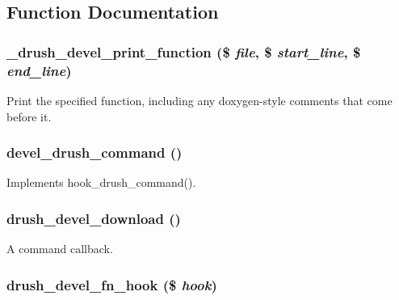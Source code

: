 \subsection{Function Documentation}
\hypertarget{devel_8drush_8inc_aace73474842484a9c0a90bf04752adc4}{
\subsubsection[{\_\-drush\_\-devel\_\-print\_\-function}]{\setlength{\rightskip}{0pt plus 5cm}\_\-drush\_\-devel\_\-print\_\-function (\$ {\em file}, \/  \$ {\em start\_\-line}, \/  \$ {\em end\_\-line})}}
\label{devel_8drush_8inc_aace73474842484a9c0a90bf04752adc4}
Print the specified function, including any doxygen-\/style comments that come before it. \hypertarget{devel_8drush_8inc_ab08f7b328ff5bab75f129b89d692e33e}{
\subsubsection[{devel\_\-drush\_\-command}]{\setlength{\rightskip}{0pt plus 5cm}devel\_\-drush\_\-command ()}}
\label{devel_8drush_8inc_ab08f7b328ff5bab75f129b89d692e33e}
Implements hook\_\-drush\_\-command(). \hypertarget{devel_8drush_8inc_acdf97b04dd6fc2c7acf9e69c6f99c833}{
\subsubsection[{drush\_\-devel\_\-download}]{\setlength{\rightskip}{0pt plus 5cm}drush\_\-devel\_\-download ()}}
\label{devel_8drush_8inc_acdf97b04dd6fc2c7acf9e69c6f99c833}
A command callback. \hypertarget{devel_8drush_8inc_a8e43e93a1b9979d8235af2458d1ba830}{
\subsubsection[{drush\_\-devel\_\-fn\_\-hook}]{\setlength{\rightskip}{0pt plus 5cm}drush\_\-devel\_\-fn\_\-hook (\$ {\em hook})}}
